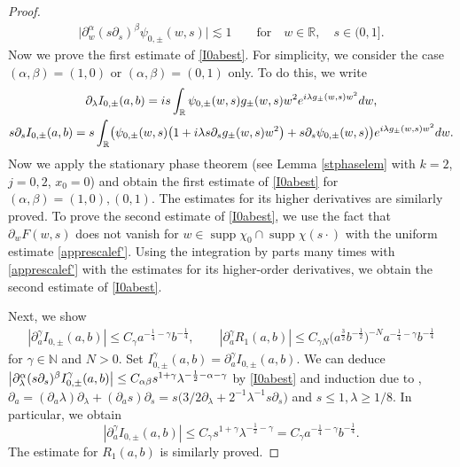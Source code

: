 \documentclass[10pt,a4paper]{article}
\numberwithin{equation}{section}
\def\R{\mathbb{R}}%
\DeclareMathOperator{\supp}{supp}%
\def\a{\alpha}
\def\b{\beta}
\def\c{\gamma}
\def\g{\psi}
\def\l{\lambda}
\def\pa{\partial}
\begin{document}
\begin{proof}
\begin{align*}
\big|\pa_w^{\a}(s\pa_s)^{\b}\g_{0,\pm}(w,s)\big|\lesssim 1\qquad \text{for}\quad w\in\R,\quad s\in (0,1].
\end{align*}
Now we prove the first estimate of \eqref{I0abest}. For simplicity, we consider the case $(\a,\b)=(1,0)$ or $(\a,\b)=(0,1)$ only. To do this, we write
\begin{gather*}
\pa_{\l}I_{0,\pm}(a,b)={\rm i}s\int_{\R}\g_{0,\pm}(w,s)g_{\pm}(w,s)w^2{\rm e}^{{\rm i}\l g_{\pm}(w,s)w^2}{\rm d}w,\\
s\pa_{s}I_{0,\pm}(a,b)=s\int_{\R}\bigl(\g_{0,\pm}(w,s)\bigl(1+{\rm i}\l s\pa_sg_{\pm}(w,s) w^2\bigr) +s\pa_s\g_{0,\pm}(w,s) \bigr) {\rm e}^{{\rm i}\l g_{\pm}(w,s)w^2}{\rm d}w.
\end{gather*}
Now we apply the stationary phase theorem (see Lemma \ref{stphaselem} with $k=2$, $j=0,2$, $x_0=0$) and obtain the first estimate of \eqref{I0abest} for $(\a,\b)=(1,0), (0,1)$. The estimates for its higher derivatives are similarly proved. To prove the second estimate of \eqref{I0abest}, we use the fact that~${\pa_wF(w,s)}$ does not vanish for $w\in \supp \chi_0\cap \supp \chi(s\cdot )$ with the uniform estimate \eqref{apprescalef'}.
 Using the integration by parts many times with \eqref{apprescalef'} with the estimates for its higher-order derivatives, we obtain the second estimate of \eqref{I0abest}.

Next, we show
\begin{align}\label{appI_0ader}
|\pa_{a}^{\c}I_{0,\pm}(a,b)|\leq C_{\c}a^{-\frac{1}{4}-\c}b^{-\frac{1}{4}},\qquad |\pa_{a}^{\c}R_1(a,b)|\leq C_{\c N}\bigl(a^{\frac{3}{2}}b^{-\frac{1}{2}}\bigr)^{-N} a^{-\frac{1}{4}-\c}b^{-\frac{1}{4}}
\end{align}
for $\c\in\mathbb{N}$ and $N>0$.
Set $I_{0,\pm}^{\c}(a,b)=\pa_a^{\c}I_{0,\pm}(a,b)$. We can deduce $\big|\pa_{\l}^{\a}(s\pa_{s})^{\b}I_{0,\pm}^{\c}(a,b)\big|\leq \smash{C_{\a\b}s^{1+\c}\l^{-\frac{1}{2}-\a-\c}}$ by \eqref{I0abest} and induction due to \smash{$I_{0,\pm}^{\c+1}=\pa_aI_{0,\pm}^{\c}$}, $\pa_a= (\pa_a\l)\pa_{\l}+(\pa_as)\pa_s= s\bigl(3/2\pa_{\l}+2^{-1}\l^{-1}s \pa_s\bigr)$ and $s\leq 1, \l\geq 1/8$. In particular, we obtain
\[
|\pa_a^{\c}I_{0,\pm}(a,b)|\leq C_{\c}s^{1+\c}\l^{-\frac{1}{2}-\c}=C_{\c}a^{-\frac{1}{4}-\c}b^{-\frac{1}{4}}.
\]
 The estimate for $R_1(a,b)$ is similarly proved.


\end{proof}
\end{document}
